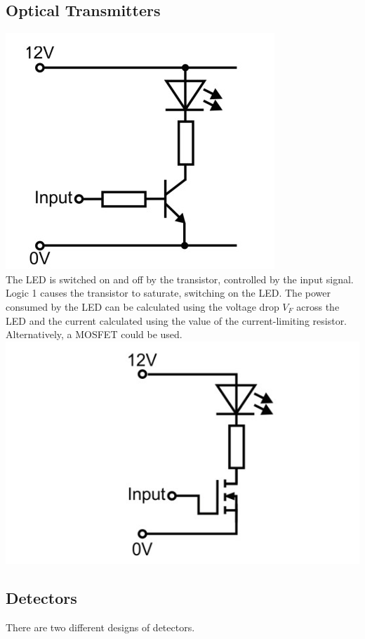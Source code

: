 \documentclass[a4paper,11pt, twocolumn]{article}
\begin{document}
\subsection{Optical Transmitters}
\includegraphics[width=\linewidth]{transmitterBJT.jpg}\\
The LED is switched on and off by the transistor, controlled by the input signal. Logic 1 causes the transistor to saturate, switching on the LED. The power consumed by the LED can be calculated using the voltage drop $V_F$ across the LED and the current calculated using the value of the current-limiting resistor. Alternatively, a MOSFET could be used.
\includegraphics[width=\linewidth]{transmitterMOSFET.jpg}
\subsection{Detectors}
There are two different designs of detectors.
\end{document}
